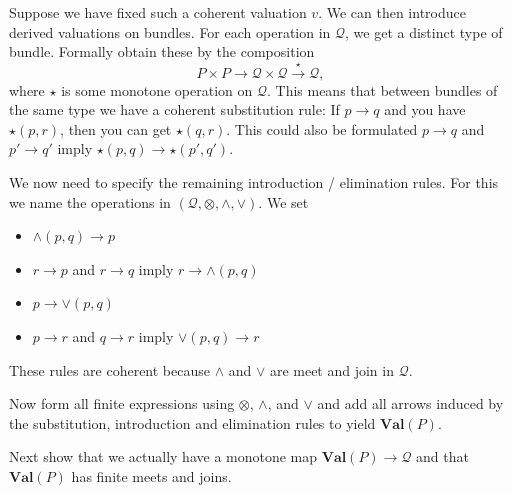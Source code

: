 \documentclass[12pt]{article}
\theoremstyle{definition}
\theoremstyle{plain}
\theoremstyle{plain}
\theoremstyle{plain}
\theoremstyle{plain}
\theoremstyle{remark}
\theoremstyle{remark}
\newcommand{\mc}[1]{\mathcal{#1}}
\begin{document}
Suppose we have fixed such a coherent valuation $v$. We can then introduce derived valuations on bundles. For each operation in $\mathcal{Q}$, we get a distinct type of bundle. Formally obtain these by the composition
$$P \times P \rightarrow \mc{Q} \times \mc{Q} \stackrel{\star}{\rightarrow} \mc{Q},$$
where $\star$ is some monotone operation on $\mc{Q}$. This means that between bundles of the same type we have a coherent substitution rule: If $p \rightarrow q$ and you have $\star(p,r)$, then you can get $\star(q,r)$. This could also be formulated $p \rightarrow q$ and $p' \rightarrow q'$ imply $\star(p,q) \rightarrow \star(p',q')$.

We now need to specify the remaining introduction / elimination rules. For this we name the operations in $(\mc{Q},\otimes, \wedge, \vee)$. We set
\begin{itemize}
	\item $\wedge(p,q) \rightarrow  p$
	\item $r \rightarrow p$ and $r \rightarrow q$ imply $r \rightarrow \wedge(p,q)$
	\item $p \rightarrow \vee(p,q)$
	\item $p \rightarrow r$ and $q \rightarrow r$ imply $\vee(p,q) \rightarrow r$	
\end{itemize}

These rules are coherent because $\wedge$ and $\vee$ are meet and join in $\mc{Q}$.

Now form all finite expressions using $\otimes$, $\wedge$, and $\vee$ and add all arrows induced by the substitution, introduction and elimination rules to yield $\mathbf{Val}(P)$. 

Next show that we actually have a monotone map $\mathbf{Val}(P) \rightarrow \mc{Q}$ and that $\mathbf{Val}(P)$ has finite meets and joins. 


\newpage
\printbibliography
\end{document}
